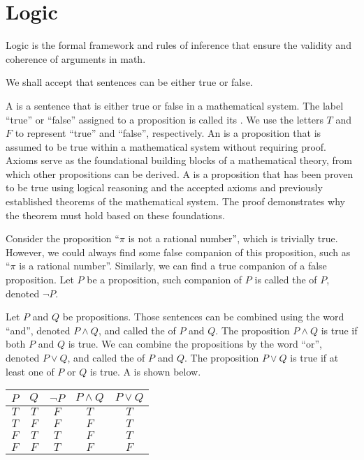 \documentclass[10pt]{article}
\begin{document}
\section{Logic}
Logic is the formal framework and rules of inference that ensure the validity and coherence of arguments in math. 
\begin{remark}
    We shall accept that sentences can be either true or false.
\end{remark} 
A  is a sentence that is either true or false in a mathematical system. The label ``true'' or ``false'' assigned to a proposition is called its . We use the letters $T$ and $F$ to represent ``true'' and ``false'', respectively. An  is a proposition that is assumed to be true within a mathematical system without requiring proof. Axioms serve as the foundational building blocks of a mathematical theory, from which other propositions can be derived. A  is a proposition that has been proven to be true using logical reasoning and the accepted axioms and previously established theorems of the mathematical system. The proof demonstrates why the theorem must hold based on these foundations.
\par
Consider the proposition ``$\pi$ is not a rational number'', which is trivially true. However, we could always find some false companion of this proposition, such as ``$\pi$ is a rational number''. Similarly, we can find a true companion of a false proposition. Let $P$ be a proposition, such companion of $P$ is called the  of $P$, denoted $\neg P$.
\par
Let $P$ and $Q$ be propositions. Those sentences can be combined using the word ``and'', denoted $P\wedge Q$, and called the  of $P$ and $Q$. The proposition $P\wedge Q$ is true if both $P$ and $Q$ is true. We can combine the propositions by the word ``or'', denoted $P\vee Q$, and called the  of $P$ and $Q$. The proposition $P\vee Q$ is true if at least one of $P$ or $Q$ is true. A  is shown below.
\begin{center}
    \begin{tabular}{cc|ccc}
        $P$ & $Q$ & $\neg P$ & $P\wedge Q$ & $P\vee Q$ \\
        \hline
        $T$ & $T$ & $F$ & $T$ & $T$ \\
        $T$ & $F$ & $F$ & $F$ & $T$ \\
        $F$ & $T$ & $T$ & $F$ & $T$ \\
        $F$ & $F$ & $T$ & $F$ & $F$ \\
    \end{tabular}
\end{center}
\end{document}
